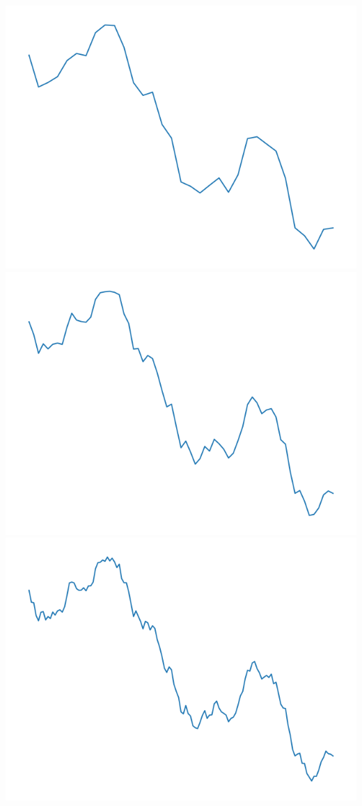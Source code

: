 \documentclass[11pt,class=report,crop=false]{standalone}
\begin{document}
\begin{exemple}
\begin{center}
\includegraphics[scale=\myscale,scale=0.2]{figures/landscape-03-5}
\includegraphics[scale=\myscale,scale=0.2]{figures/landscape-03-6}
\includegraphics[scale=\myscale,scale=0.2]{figures/landscape-03-7}

\end{center}
\end{exemple}
\end{document}
